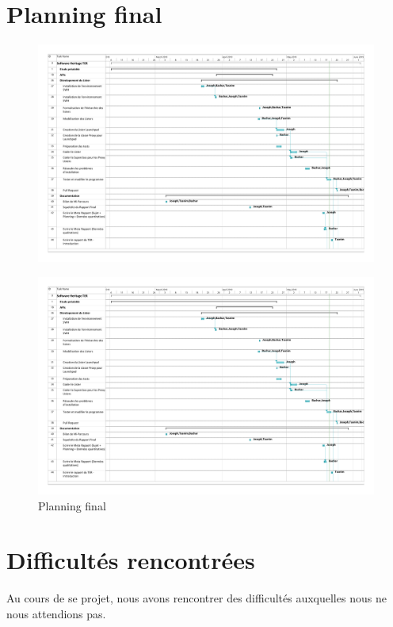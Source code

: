 \documentclass[12pt,a4paper]{report}
\begin{document}
	\section{Planning final}
	\begin{figure}[!ht]
	\hspace*{-3cm}
	\includegraphics[scale=0.45]{pdfs/planning_final_summary.pdf}
	\end{figure}
	\begin{figure}[!ht]
	\hspace*{-3cm}
	\includegraphics[scale=0.45,page=2]{pdfs/planning_final_summary.pdf}
	\caption{Planning final}
	\end{figure}

	\section{Difficultés rencontrées}
	Au cours de se projet, nous avons rencontrer des difficultés auxquelles nous ne nous attendions pas.
\end{document}
